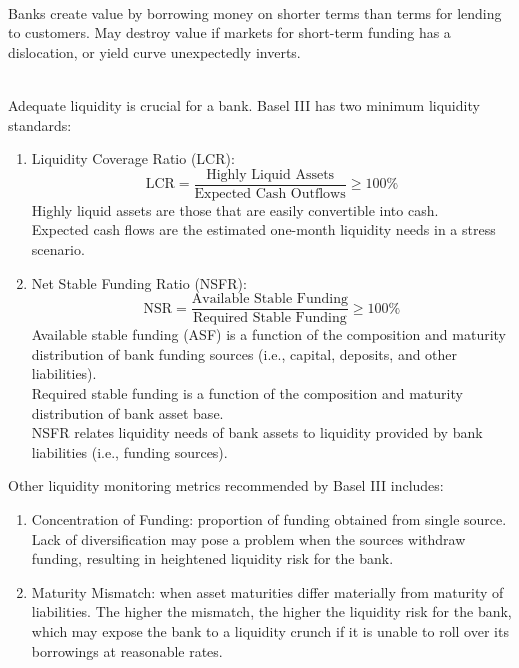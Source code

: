 \begin{definition} \\
Banks create value by borrowing money on shorter terms than terms for lending to customers. May destroy value if markets for short-term funding has a dislocation, or yield curve unexpectedly inverts.
\end{definition}

\begin{definition} \\
Adequate liquidity is crucial for a bank. Basel III has two minimum liquidity standards:
\begin{enumerate}[label=\roman*.]
\setlength{\itemsep}{0pt}
\item Liquidity Coverage Ratio (LCR): 
\begin{equation}
\text{LCR} = \frac{\text{Highly Liquid Assets}}{\text{Expected Cash Outflows}} \geq 100\% \nonumber
\end{equation}
Highly liquid assets are those that are easily convertible into cash.\\
Expected cash flows are the estimated one-month liquidity needs in a stress scenario.
\item Net Stable Funding Ratio (NSFR):
\begin{equation}
\text{NSR} = \frac{\text{Available Stable Funding}}{\text{Required Stable Funding}} \geq 100\% \nonumber
\end{equation}
Available stable funding (ASF) is a function of the composition and maturity distribution of bank funding sources (i.e., capital, deposits, and other liabilities).\\
Required stable funding is a function of the composition and maturity distribution of bank asset base.\\
NSFR relates liquidity needs of bank assets to liquidity provided by bank liabilities (i.e., funding sources).
\end{enumerate}
Other liquidity monitoring metrics recommended by Basel III includes:
\begin{enumerate}[label=\roman*.]
\setlength{\itemsep}{0pt}
\item Concentration of Funding: proportion of funding obtained from single source. Lack of diversification may pose a problem when the sources withdraw funding, resulting in heightened liquidity risk for the bank.
\item Maturity Mismatch: when asset maturities differ materially from maturity of liabilities. The higher the mismatch, the higher the liquidity risk for the bank, which may expose the bank to a liquidity crunch if it is unable to roll over its borrowings at reasonable rates.
\end{enumerate}
\end{definition}

